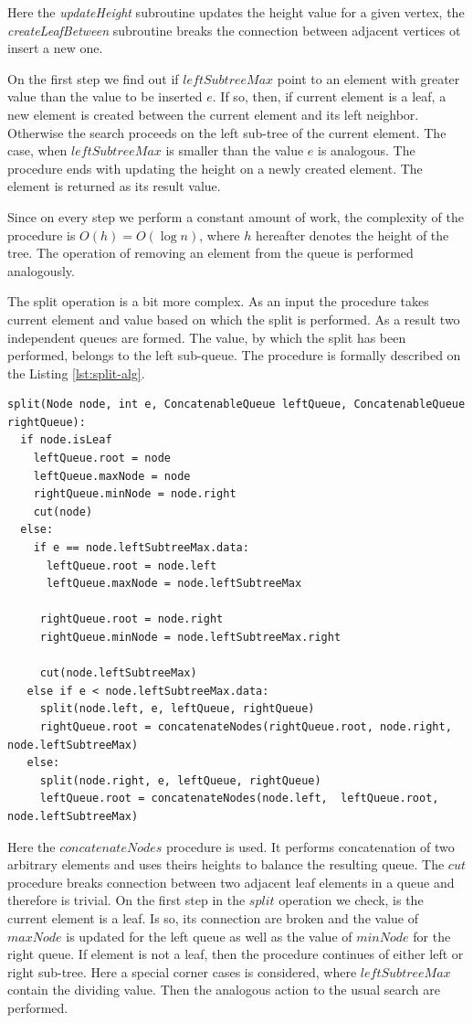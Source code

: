 \documentclass[conference]{IEEEtran}
\theoremstyle{plane}
\begin{document}
		Here the \textit{updateHeight} subroutine updates the height value for a given vertex, the \textit{createLeafBetween} subroutine breaks the connection between adjacent vertices ot insert a new one.
		
		On the first step we find out if $leftSubtreeMax$ point to an element with greater value than the value to be inserted $e$. If so, then, if current element is a leaf, a new element is created between the current element and its left neighbor. Otherwise the search proceeds on the left sub-tree of the current element. The case, when $leftSubtreeMax$ is smaller than the value $e$ is analogous. The procedure ends with updating the height on a newly created element. The element is returned as its result value.
		
		Since on every step we perform a constant amount of work, the complexity of the procedure is $O(h)=O(\log n)$, where $h$ hereafter denotes the height of the tree. The operation of removing an element from the queue is performed analogously. 
		
		The split operation is a bit more complex. As an input the procedure takes current element and value based on which the split is performed. As a result two independent queues are formed. The value, by which the split has been performed, belongs to the left sub-queue. The procedure is formally described on the Listing \ref{lst:split-alg}.
		
		\begin{lstlisting}[caption={Queue split algorithm},label={lst:split-alg},captionpos=b]
split(Node node, int e, ConcatenableQueue leftQueue, ConcatenableQueue rightQueue): 
  if node.isLeaf
    leftQueue.root = node
    leftQueue.maxNode = node	
    rightQueue.minNode = node.right	
    cut(node)
  else:
    if e == node.leftSubtreeMax.data:
      leftQueue.root = node.left
      leftQueue.maxNode = node.leftSubtreeMax
  	  
     rightQueue.root = node.right
     rightQueue.minNode = node.leftSubtreeMax.right
  	  
     cut(node.leftSubtreeMax)
   else if e < node.leftSubtreeMax.data:
     split(node.left, e, leftQueue, rightQueue)
     rightQueue.root = concatenateNodes(rightQueue.root, node.right, node.leftSubtreeMax)
   else:
     split(node.right, e, leftQueue, rightQueue)
     leftQueue.root = concatenateNodes(node.left,  leftQueue.root, node.leftSubtreeMax)
		\end{lstlisting}
		
		Here the $concatenateNodes$ procedure is used. It performs concatenation of two arbitrary elements and uses theirs heights to balance the resulting queue. The $cut$ procedure breaks connection between two adjacent leaf elements in a queue and therefore is trivial. On the first step in the $split$ operation we check, is the current element is a leaf. Is so, its connection are broken and the value of $maxNode$ is updated for the left queue as well as the value of $minNode$ for the right queue. If element is not a leaf, then the procedure continues of either left or right sub-tree. Here a special corner cases is considered, where $leftSubtreeMax$ contain the dividing value. Then the analogous action to the usual search are performed.
		
\end{document}
